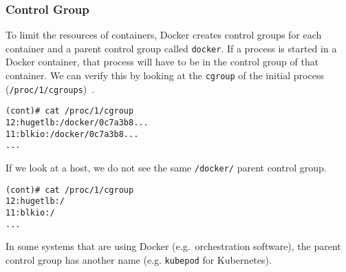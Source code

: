 \subsubsection{Control Group}\label{subsubsection:detection:cgroup}
To limit the resources of containers, Docker creates control groups for each container and a parent control group called \lstinline{docker}. If a process is started in a Docker container, that process will have to be in the control group of that container. We can verify this by looking at the \lstinline{cgroup} of the initial process (\lstinline{/proc/1/cgroups})~\cite{Metasploit-Linux-Gather-Container-Detection}.

\begin{lstlisting}[caption={Process control group inside container.\protect\footnotemark},captionpos=b]
(cont)# cat /proc/1/cgroup
12:hugetlb:/docker/0c7a3b8...
11:blkio:/docker/0c7a3b8...
...
\end{lstlisting}

If we look at a host, we do not see the same \lstinline{/docker/} parent control group.
\begin{lstlisting}[caption={Process control groups on the host.},captionpos=b]
(cont)# cat /proc/1/cgroup
12:hugetlb:/
11:blkio:/
...
\end{lstlisting}

In some systems that are using Docker (e.g.\ orchestration software), the parent control group has another name (e.g. \lstinline{kubepod} for Kubernetes).
